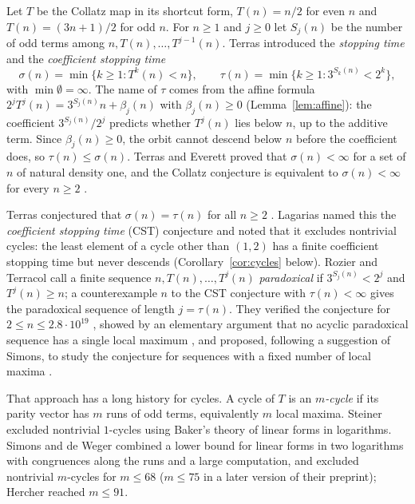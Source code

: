 \documentclass[11pt]{amsart}
\theoremstyle{definition}
\theoremstyle{remark}
\begin{document}
Let $T$ be the Collatz map in its shortcut form, $T(n)=n/2$ for even $n$ and $T(n)=(3n+1)/2$ for odd $n$. For $n\ge1$ and $j\ge0$ let $S_j(n)$ be the number of odd terms among $n,T(n),\dots,T^{j-1}(n)$. Terras \cite{Ter76} introduced the \emph{stopping time} and the \emph{coefficient stopping time}
\[
\sigma(n)=\min\{k\ge1: T^{k}(n)<n\},\qquad \tau(n)=\min\{k\ge1: 3^{S_k(n)}<2^{k}\},
\]
with $\min\emptyset=\infty$. The name of $\tau$ comes from the affine formula $2^{j}T^{j}(n)=3^{S_j(n)}n+\beta_j(n)$ with $\beta_j(n)\ge0$ (Lemma~\ref{lem:affine}): the coefficient $3^{S_j(n)}/2^{j}$ predicts whether $T^{j}(n)$ lies below $n$, up to the additive term. Since $\beta_j(n)\ge0$, the orbit cannot descend below $n$ before the coefficient does, so $\tau(n)\le\sigma(n)$. Terras \cite{Ter76} and Everett \cite{Eve77} proved that $\sigma(n)<\infty$ for a set of $n$ of natural density one, and the Collatz conjecture is equivalent to $\sigma(n)<\infty$ for every $n\ge2$ \cite{Lag85,Lag10}.

Terras conjectured that $\sigma(n)=\tau(n)$ for all $n\ge2$ \cite{Ter76}. Lagarias \cite{Lag85} named this the \emph{coefficient stopping time} (CST) conjecture and noted that it excludes nontrivial cycles: the least element of a cycle other than $(1,2)$ has a finite coefficient stopping time but never descends (Corollary~\ref{cor:cycles} below). Rozier and Terracol \cite{RT26} call a finite sequence $n,T(n),\dots,T^{j}(n)$ \emph{paradoxical} if $3^{S_j(n)}<2^{j}$ and $T^{j}(n)\ge n$; a counterexample $n$ to the CST conjecture with $\tau(n)<\infty$ gives the paradoxical sequence of length $j=\tau(n)$. They verified the conjecture for $2\le n\le 2.8\cdot10^{19}$ \cite[Corollary~5.4]{RT26}, showed by an elementary argument that no acyclic paradoxical sequence has a single local maximum \cite[Appendix~A]{RT26}, and proposed, following a suggestion of Simons, to study the conjecture for sequences with a fixed number of local maxima \cite[Remark~5.5]{RT26}.

That approach has a long history for cycles. A cycle of $T$ is an \emph{$m$-cycle} if its parity vector has $m$ runs of odd terms, equivalently $m$ local maxima. Steiner \cite{Ste77} excluded nontrivial $1$-cycles using Baker's theory of linear forms in logarithms. Simons and de Weger \cite{SdW05} combined a lower bound for linear forms in two logarithms with congruences along the runs and a large computation, and excluded nontrivial $m$-cycles for $m\le68$ ($m\le75$ in a later version of their preprint); Hercher \cite{Her23} reached $m\le91$.
\end{document}
